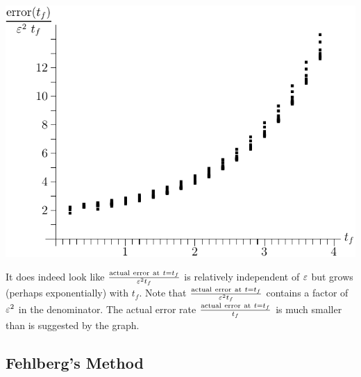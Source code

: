 \begin{efig}
\begin{center}
    \includegraphics{vble4_error.pdf}
\end{center}
\end{efig}
It does indeed look like $\frac{{\rm actual\ error\ at\ }t=t_f}{\veps^2 t_f}$
is relatively independent of $\varepsilon$ but grows (perhaps exponentially) with $t_f$. Note that $\frac{{\rm actual\ error\ at\ }t=t_f}{\veps^2 t_f}$ contains a factor of $\varepsilon^2$ in the denominator. The actual error rate 
$\frac{{\rm actual\ error\ at\ }t=t_f}{t_f}$ is much smaller than is suggested by the graph.

\subsection{Fehlberg's Method}

